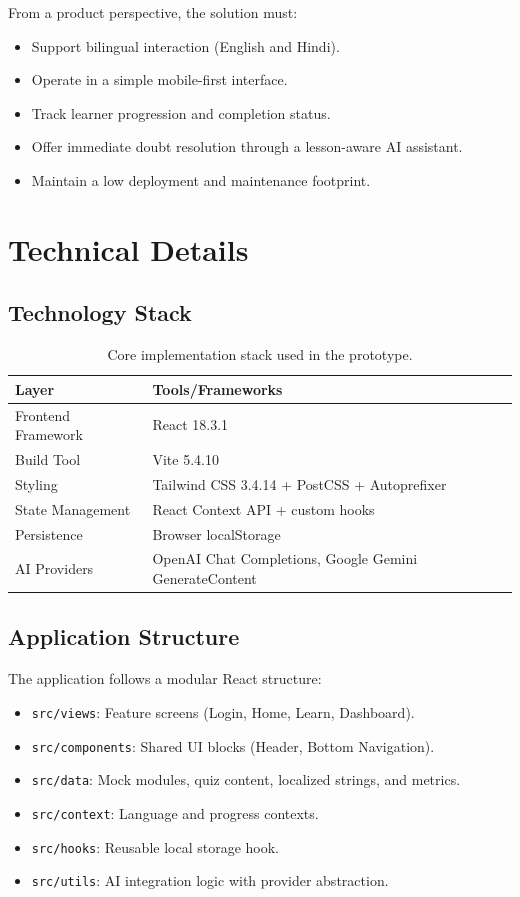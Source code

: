 \documentclass[12pt,a4paper]{article}
\begin{document}
From a product perspective, the solution must:
\begin{itemize}[leftmargin=*]
\item Support bilingual interaction (English and Hindi).
\item Operate in a simple mobile-first interface.
\item Track learner progression and completion status.
\item Offer immediate doubt resolution through a lesson-aware AI assistant.
\item Maintain a low deployment and maintenance footprint.
\end{itemize}

\section{Technical Details}
\subsection{Technology Stack}
\begin{table}[h]
\centering
\begin{tabular}{ll}
\toprule
Layer & Tools/Frameworks \\
\midrule
Frontend Framework & React 18.3.1 \\
Build Tool & Vite 5.4.10 \\
Styling & Tailwind CSS 3.4.14 + PostCSS + Autoprefixer \\
State Management & React Context API + custom hooks \\
Persistence & Browser localStorage \\
AI Providers & OpenAI Chat Completions, Google Gemini GenerateContent \\
\bottomrule
\end{tabular}
\caption{Core implementation stack used in the prototype.}
\end{table}

\subsection{Application Structure}
The application follows a modular React structure:
\begin{itemize}[leftmargin=*]
\item \texttt{src/views}: Feature screens (Login, Home, Learn, Dashboard).
\item \texttt{src/components}: Shared UI blocks (Header, Bottom Navigation).
\item \texttt{src/data}: Mock modules, quiz content, localized strings, and metrics.
\item \texttt{src/context}: Language and progress contexts.
\item \texttt{src/hooks}: Reusable local storage hook.
\item \texttt{src/utils}: AI integration logic with provider abstraction.
\end{itemize}
\end{document}
